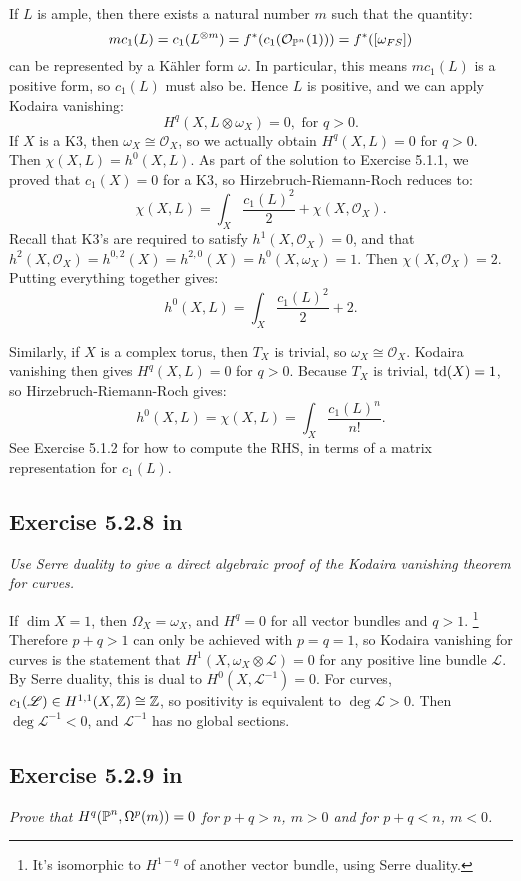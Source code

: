 \documentclass{article}
\begin{document}
If $L$ is ample, then there exists a natural number $m$ such that the quantity:
\[	m c_1(L) = c_1(L^{\otimes m}) = f^*(c_1(\mathcal{O}_{\operatorname{\mathbb{P}}^n}(1))) = f^*([\omega_{FS}])	\]
can be represented by a K\"{a}hler form $\omega$. In particular, this means $mc_1(L)$ is a positive form, so
$c_1(L)$ must also be. Hence $L$ is positive, and we can apply Kodaira vanishing:
\[	H^q(X,L\otimes \omega_X) = 0, \text{ for } q>0.	\]
If $X$ is a K3, then $\omega_X \cong \mathcal{O}_X$, so we actually obtain $H^q(X,L) = 0$ for $q>0$. Then
$\chi(X,L) = h^0(X,L)$. As part of the solution to Exercise 5.1.1, we proved that $c_1(X) = 0$ for a K3,
so Hirzebruch-Riemann-Roch reduces to:
\[	\chi(X,L) = \int_X \frac{c_1(L)^2}{2} + \chi(X,\mathcal{O}_X). 	\]
Recall that K3's are required to satisfy $h^1(X,\mathcal{O}_X) = 0$, and that $h^2(X,\mathcal{O}_X) = h^{0,2}(X)
= h^{2,0}(X) = h^0(X,\omega_X) = 1$. Then $\chi(X,\mathcal{O}_X) = 2$. Putting everything together gives:
\[	h^0(X,L) = \int_X \frac{c_1(L)^2}{2} + 2.	\]

Similarly, if $X$ is a complex torus, then $T_X$ is trivial, so $\omega_X \cong \mathcal{O}_X$. Kodaira vanishing
then gives $H^q(X,L) = 0$ for $q>0$. Because $T_X$ is trivial, $\operatorname{td}(X) = 1$, so Hirzebruch-Riemann-Roch gives:
\[	h^0(X,L) = \chi(X,L) = \int_X \frac{c_1(L)^n}{n!} .	\]
See Exercise 5.1.2 for how to compute the RHS, in terms of a matrix representation for $c_1(L)$.




\subsection*{Exercise 5.2.8 in \cite{Huy}}
\emph{Use Serre duality to give a direct algebraic proof of the Kodaira vanishing theorem for curves.}
\vspace{3mm}

If $\dim X = 1$, then $\Omega_X = \omega_X$, and $H^q = 0$ for all vector bundles and $q>1$.
\footnote{It's isomorphic to $H^{1-q}$ of another vector bundle, using Serre duality.} Therefore $p+q>1$ can only
be achieved with $p=q=1$, so Kodaira vanishing for curves is the statement that $H^1(X,\omega_X \otimes \mathscr{L}) =0$
for any positive line bundle $\mathscr{L}$. By Serre duality, this is dual to $H^0(X,\mathscr{L}^{-1}) = 0$. For curves,
$c_1(\mathscr{L}) \in H^{1,1}(X,\mathbb{Z}) \cong \mathbb{Z}$, so positivity is equivalent to $\deg \mathscr{L} >0$. Then
$\deg \mathscr{L}^{-1} < 0$, and $\mathscr{L}^{-1}$ has no global sections.


\subsection*{Exercise 5.2.9 in \cite{Huy}}
\emph{Prove that $H^q(\operatorname{\mathbb{P}}^n, \Omega^p(m)) = 0$ for $p + q > n$, $m > 0$ and for $p + q < n$,
$m < 0$.}
\vspace{3mm}
\end{document}
